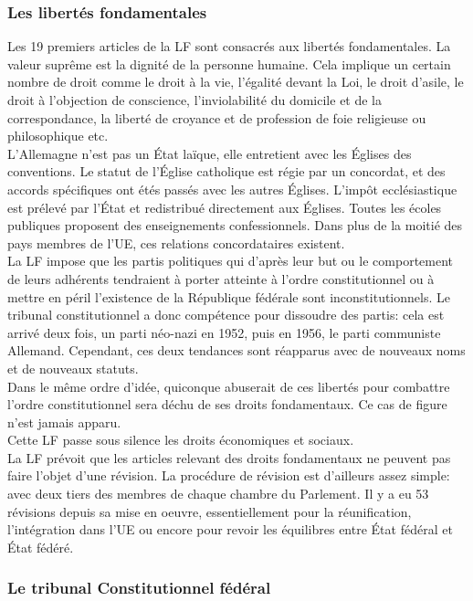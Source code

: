 \documentclass[10pt, a4paper, openany]{book}
\begin{document}
\subsubsection{Les libertés fondamentales}

Les 19 premiers articles de la LF sont consacrés aux libertés fondamentales. La valeur suprême est la dignité de la personne humaine. Cela implique un certain nombre de droit comme le droit à la vie, l'égalité devant la Loi, le droit d'asile, le droit à l'objection de conscience, l'inviolabilité du domicile et de la correspondance, la liberté de croyance et de profession de foie religieuse ou philosophique etc. \\
L'Allemagne n'est pas un État laïque, elle entretient avec les Églises des conventions. Le statut de l'Église catholique est régie par un concordat, et des accords spécifiques ont étés passés avec les autres Églises. L'impôt ecclésiastique est prélevé par l'État et redistribué directement aux Églises. Toutes les écoles publiques proposent des enseignements confessionnels. Dans plus de la moitié des pays membres de l'UE, ces relations concordataires existent. \\
La LF impose que les partis politiques qui d'après leur but ou le comportement de leurs adhérents tendraient à porter atteinte à l'ordre constitutionnel ou à mettre en péril l'existence de la République fédérale sont inconstitutionnels. Le tribunal constitutionnel a donc compétence pour dissoudre des partis: cela est arrivé deux fois, un parti néo-nazi en 1952, puis en 1956, le parti communiste Allemand. Cependant, ces deux tendances sont réapparus avec de nouveaux noms et de nouveaux statuts. \\
Dans le même ordre d'idée, quiconque abuserait de ces libertés pour combattre l'ordre constitutionnel sera déchu de ses droits fondamentaux. Ce cas de figure n'est jamais apparu. \\
Cette LF passe sous silence les droits économiques et sociaux. \\
La LF prévoit que les articles relevant des droits fondamentaux ne peuvent pas faire l'objet d'une révision. La procédure de révision est d'ailleurs assez simple: avec deux tiers des membres de chaque chambre du Parlement. Il y a eu 53 révisions depuis sa mise en oeuvre, essentiellement pour la réunification, l'intégration dans l'UE ou encore pour revoir les équilibres entre État fédéral et État fédéré. \\

\subsubsection{Le tribunal Constitutionnel fédéral}
\end{document}
